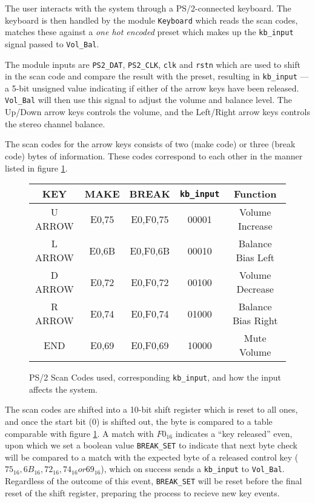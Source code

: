 The user interacts with the system through a PS/2-connected keyboard. The keyboard is then handled by the module \verb?Keyboard? which reads the scan codes, matches these against a \emph{one hot encoded} preset which makes up the \verb?kb_input? signal passed to \verb?Vol_Bal?.

The module inputs are \verb=PS2_DAT=, \verb=PS2_CLK=, \verb=clk= and \verb=rstn= which are used to shift in the scan code and compare the result with the preset, resulting in \verb=kb_input= --- a 5-bit unsigned value indicating if either of the arrow keys have been released. \verb=Vol_Bal= will then use this signal to adjust the volume and balance level. The Up/Down arrow keys controls the volume, and the Left/Right arrow keys controls the stereo channel balance.

The scan codes for the arrow keys consists of two (make code) or three (break code) bytes of information. These codes correspond to each other in the manner listed in figure \ref{fig:scancodes}. 

\begin{figure}[h]
\centering
\caption{PS/2 Scan Codes used, corresponding \texttt{kb\_input}, and how the input affects the system.}
\begin{tabular}{|c|c|c|c|c|}
\hline
KEY & MAKE & BREAK & \verb+kb_input+ & Function\\ \hline
U ARROW & E0,75 & E0,F0,75 & 00001 & Volume Increase\\ \hline
L ARROW & E0,6B & E0,F0,6B & 00010 & Balance Bias Left\\ \hline
D ARROW & E0,72 & E0,F0,72 & 00100 & Volume Decrease\\ \hline
R ARROW & E0,74 & E0,F0,74 & 01000 & Balance Bias Right\\ \hline
END		& E0,69 & E0,F0,69 & 10000 & Mute Volume\\ \hline
\end{tabular}
\label{fig:scancodes}
\end{figure}

The scan codes are shifted into a 10-bit shift register which is reset to all ones, and once the start bit (0) is shifted out, the byte is compared to a table comparable with figure \ref{fig:scancodes}. A match with $F0_{16}$ indicates a ``key released'' even, upon which we set a boolean value \verb=BREAK_SET= to indicate that next byte check will be compared to a match with the expected byte of a released control key ($75_{16}, 6B_{16}, 72_{16}, 74_{16} or 69_{16}$), which on success sends a \verb+kb_input+ to \verb+Vol_Bal+. Regardless of the outcome of this event, \verb=BREAK_SET= will be reset before the final reset of the shift register, preparing the process to recieve new key events.
